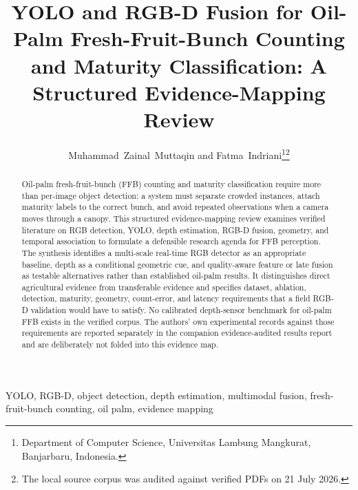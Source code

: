 \documentclass[journal]{IEEEtran}
\begin{document}
\title{YOLO and RGB-D Fusion for Oil-Palm Fresh-Fruit-Bunch Counting and Maturity Classification: A Structured Evidence-Mapping Review}
\author{Muhammad~Zainal~Muttaqin and Fatma~Indriani\thanks{Department of Computer Science, Universitas Lambung Mangkurat, Banjarbaru, Indonesia.}\thanks{The local source corpus was audited against verified PDFs on 21 July 2026.}}
\maketitle
\begin{abstract}
Oil-palm fresh-fruit-bunch (FFB) counting and maturity classification require
more than per-image object detection: a system must separate crowded instances,
attach maturity labels to the correct bunch, and avoid repeated observations
when a camera moves through a canopy. This structured evidence-mapping review
examines verified literature on RGB detection, YOLO, depth estimation, RGB-D
fusion, geometry, and temporal association to formulate a defensible research
agenda for FFB perception. The synthesis identifies a multi-scale real-time
RGB detector as an appropriate baseline, depth as a conditional geometric cue,
and quality-aware feature or late fusion as testable alternatives rather than
established oil-palm results. It distinguishes direct agricultural evidence
from transferable evidence and specifies dataset, ablation, detection, maturity,
geometry, count-error, and latency requirements that a field RGB-D validation
would have to satisfy. No calibrated depth-sensor benchmark for oil-palm FFB
exists in the verified corpus. The authors' own experimental records against
those requirements are reported separately in the companion evidence-audited
results report and are deliberately not folded into this evidence map.
\end{abstract}
\begin{IEEEkeywords}YOLO, RGB-D, object detection, depth estimation, multimodal fusion, fresh-fruit-bunch counting, oil palm, evidence mapping\end{IEEEkeywords}



\end{document}
